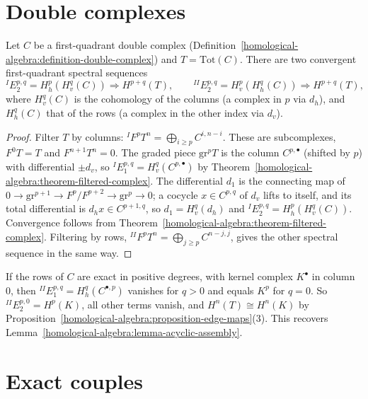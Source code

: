 \section{Double complexes}\label{homological-algebra:section-double-complexes-spectral-sequences}

\begin{theorem}\label{homological-algebra:theorem-double-complex}
Let $C$ be a first-quadrant double complex (Definition~\ref{homological-algebra:definition-double-complex}) and $T = \mathrm{Tot}(C)$.
There are two convergent first-quadrant spectral sequences
\[
{}^{I}E_2^{p,q} = H^p_h(H^q_v(C)) \Rightarrow H^{p+q}(T), \qquad {}^{II}E_2^{p,q} = H^p_v(H^q_h(C)) \Rightarrow H^{p+q}(T),
\]
where $H_v^q(C)$ is the cohomology of the columns (a complex in $p$ via $d_h$), and $H_h^q(C)$ that of the rows (a complex in the
other index via $d_v$).
\end{theorem}

\begin{proof}
Filter $T$ by columns: ${}^IF^pT^n = \bigoplus_{i \geq p}C^{i, n-i}$. These are subcomplexes, $F^0T = T$ and $F^{n+1}T^n = 0$. The graded
piece $\mathrm{gr}^pT$ is the column $C^{p,\bullet}$ (shifted by $p$) with differential $\pm d_v$, so
${}^IE_1^{p,q} = H^q_v(C^{p,\bullet})$ by Theorem~\ref{homological-algebra:theorem-filtered-complex}. The differential $d_1$ is the
connecting map of $0 \to \mathrm{gr}^{p+1} \to F^p/F^{p+2} \to \mathrm{gr}^p \to 0$; a cocycle $x \in C^{p,q}$ of $d_v$ lifts to itself, and its total
differential is $d_hx \in C^{p+1,q}$, so $d_1 = H^q_v(d_h)$ and ${}^IE_2^{p,q} = H^p_h(H^q_v(C))$. Convergence follows from
Theorem~\ref{homological-algebra:theorem-filtered-complex}. Filtering by rows, ${}^{II}F^pT^n = \bigoplus_{j \geq p}C^{n-j, j}$, gives the other
spectral sequence in the same way.
\end{proof}

\begin{example}\label{homological-algebra:example-acyclic-assembly}
If the rows of $C$ are exact in positive degrees, with kernel complex $K^\bullet$ in column $0$, then ${}^{II}E_1^{p,q} = H^q_h(C^{\bullet,p})$
vanishes for $q > 0$ and equals $K^p$ for $q = 0$. So ${}^{II}E_2^{p,0} = H^p(K)$, all other terms vanish, and
$H^n(T) \cong H^n(K)$ by Proposition~\ref{homological-algebra:proposition-edge-maps}(3). This recovers
Lemma~\ref{homological-algebra:lemma-acyclic-assembly}.
\end{example}

\section{Exact couples}\label{homological-algebra:section-exact-couples}

